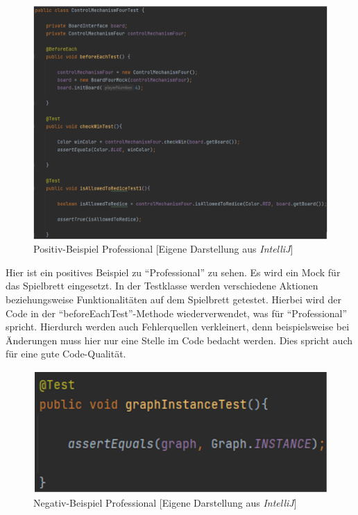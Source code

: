 \begin{figure}[htbp]
\centering
\centerline{\includegraphics[scale=.5]{professional}}
\caption{Positiv-Beispiel Professional [Eigene Darstellung aus \emph{IntelliJ}]}
\label{fig:professional}
\end{figure}

\noindent Hier ist ein positives Beispiel zu \enquote{Professional} zu sehen. Es wird ein Mock für das Spielbrett eingesetzt. In der Testklasse werden verschiedene Aktionen beziehungsweise Funktionalitäten auf dem Spielbrett getestet. Hierbei wird der Code in der \enquote{beforeEachTest}-Methode wiederverwendet, was für \enquote{Professional} spricht. Hierdurch werden auch Fehlerquellen verkleinert, denn beispielsweise bei Änderungen muss hier nur eine Stelle im Code bedacht werden. Dies spricht auch für eine gute Code-Qualität.

\newpage

\begin{figure}[htbp]
\centering
\centerline{\includegraphics[scale=.5]{notprofessional}}
\caption{Negativ-Beispiel Professional [Eigene Darstellung aus \emph{IntelliJ}]}
\label{fig:notprofessional}
\end{figure}

